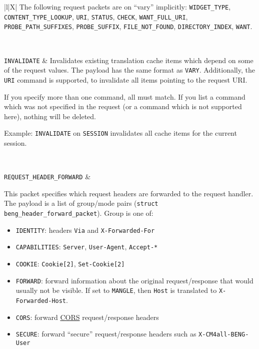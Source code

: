 \documentclass[a4paper,12pt]{article}
\begin{document}
\begin{longtabu*}{|l|X|}
The following request packets are on ``vary'' implicitly:
\verb|WIDGET_TYPE|, \verb|CONTENT_TYPE_LOOKUP|, \verb|URI|,
\verb|STATUS|, \verb|CHECK|, \verb|WANT_FULL_URI|,
\verb|PROBE_PATH_SUFFIXES|, \verb|PROBE_SUFFIX|,
\verb|FILE_NOT_FOUND|, \verb|DIRECTORY_INDEX|, \verb|WANT|.

\\

\hline

\verb|INVALIDATE| & Invalidates existing translation cache items
which depend on some of the request values.  The payload has the same
format as \verb|VARY|.  Additionally, the \verb|URI| command is
supported, to invalidate all items pointing to the request URI.

If you specify more than one command, all must match.  If you list a
command which was not specified in the request (or a command which is
not supported here), nothing will be deleted.

Example: \verb|INVALIDATE| on \verb|SESSION| invalidates all cache
items for the current session.

\\

\hline

\label{tfwdheader}
\verb|REQUEST_HEADER_FORWARD| &

This packet specifies which request headers are forwarded to the
request handler.  The payload is a list of group/mode pairs
(\texttt{struct beng\_header\_forward\_packet}).  Group is one of:

\begin{itemize}
\item \texttt{IDENTITY}: headers \texttt{Via} and
  \texttt{X-Forwarded-For}
\item \texttt{CAPABILITIES}: \texttt{Server}, \texttt{User-Agent},
  \texttt{Accept-*}
\item \texttt{COOKIE}: \texttt{Cookie[2]}, \texttt{Set-Cookie[2]}

\item \texttt{FORWARD}: forward information about the original
  request/response that would usually not be visible.  If set to
  \verb|MANGLE|, then \texttt{Host} is translated to
  \texttt{X-Forwarded-Host}.

\item \texttt{CORS}: forward
  \href{http://www.w3.org/TR/cors/#syntax}{CORS} request/response
  headers

\item \texttt{SECURE}: forward ``secure'' request/response headers
  such as \texttt{X-CM4all-BENG-User}


\end{itemize}
\end{longtabu*}
\end{document}
